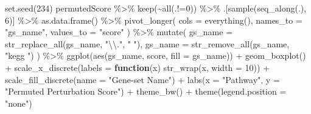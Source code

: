 \documentclass[9pt,a4paper,]{extarticle}
\newenvironment{Shaded}{\begin{snugshade}}{\end{snugshade}}
\newcommand{\AttributeTok}[1]{\textcolor[rgb]{0.77,0.63,0.00}{#1}}
\newcommand{\ControlFlowTok}[1]{\textcolor[rgb]{0.13,0.29,0.53}{\textbf{#1}}}
\newcommand{\DecValTok}[1]{\textcolor[rgb]{0.00,0.00,0.81}{#1}}
\newcommand{\FunctionTok}[1]{\textcolor[rgb]{0.00,0.00,0.00}{#1}}
\newcommand{\NormalTok}[1]{#1}
\newcommand{\SpecialCharTok}[1]{\textcolor[rgb]{0.00,0.00,0.00}{#1}}
\newcommand{\StringTok}[1]{\textcolor[rgb]{0.31,0.60,0.02}{#1}}
\begin{document}
\begin{Shaded}
\begin{Highlighting}[]
\FunctionTok{set.seed}\NormalTok{(}\DecValTok{234}\NormalTok{)}
\NormalTok{permutedScore }\SpecialCharTok{\%\textgreater{}\%}
    \FunctionTok{keep}\NormalTok{(}\SpecialCharTok{\textasciitilde{}}\FunctionTok{all}\NormalTok{(.}\SpecialCharTok{!=}\DecValTok{0}\NormalTok{)) }\SpecialCharTok{\%\textgreater{}\%}
\NormalTok{    .[}\FunctionTok{sample}\NormalTok{(}\FunctionTok{seq\_along}\NormalTok{(.), }\DecValTok{6}\NormalTok{)] }\SpecialCharTok{\%\textgreater{}\%}
    \FunctionTok{as.data.frame}\NormalTok{() }\SpecialCharTok{\%\textgreater{}\%}
    \FunctionTok{pivot\_longer}\NormalTok{(}
      \AttributeTok{cols =} \FunctionTok{everything}\NormalTok{(), }\AttributeTok{names\_to =} \StringTok{"gs\_name"}\NormalTok{, }\AttributeTok{values\_to =} \StringTok{"score"}
\NormalTok{    ) }\SpecialCharTok{\%\textgreater{}\%}
    \FunctionTok{mutate}\NormalTok{(}
        \AttributeTok{gs\_name =} \FunctionTok{str\_replace\_all}\NormalTok{(gs\_name, }\StringTok{"}\SpecialCharTok{\textbackslash{}\textbackslash{}}\StringTok{."}\NormalTok{, }\StringTok{" "}\NormalTok{),}
        \AttributeTok{gs\_name =} \FunctionTok{str\_remove\_all}\NormalTok{(gs\_name, }\StringTok{"kegg "}\NormalTok{)}
\NormalTok{    ) }\SpecialCharTok{\%\textgreater{}\%}
    \FunctionTok{ggplot}\NormalTok{(}\FunctionTok{aes}\NormalTok{(gs\_name, score, }\AttributeTok{fill =}\NormalTok{ gs\_name)) }\SpecialCharTok{+}
    \FunctionTok{geom\_boxplot}\NormalTok{() }\SpecialCharTok{+}
    \FunctionTok{scale\_x\_discrete}\NormalTok{(}\AttributeTok{labels =} \ControlFlowTok{function}\NormalTok{(x) }\FunctionTok{str\_wrap}\NormalTok{(x, }\AttributeTok{width =} \DecValTok{10}\NormalTok{)) }\SpecialCharTok{+}
    \FunctionTok{scale\_fill\_discrete}\NormalTok{(}\AttributeTok{name =} \StringTok{"Gene{-}set Name"}\NormalTok{) }\SpecialCharTok{+} 
    \FunctionTok{labs}\NormalTok{(}\AttributeTok{x =} \StringTok{"Pathway"}\NormalTok{, }\AttributeTok{y =} \StringTok{"Permuted Perturbation Score"}\NormalTok{) }\SpecialCharTok{+}
    \FunctionTok{theme\_bw}\NormalTok{() }\SpecialCharTok{+} 
    \FunctionTok{theme}\NormalTok{(}\AttributeTok{legend.position =} \StringTok{"none"}\NormalTok{)}
\end{Highlighting}
\end{Shaded}
\end{document}
